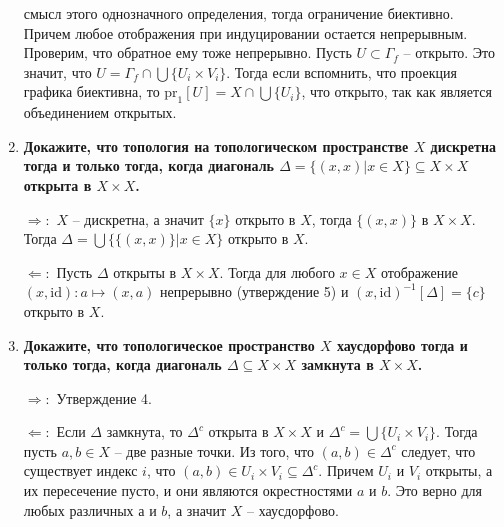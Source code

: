 \documentclass{article}
\begin{document}
\begin{enumerate}
        смысл этого однозначного определения, тогда ограничение биективно.
        Причем любое отображения при индуцировании остается непрерывным.
        Проверим, что обратное ему тоже непрерывно. Пусть $U\subset\Gamma_f$ –
        открыто. Это значит, что $U=\Gamma_f\cap\bigcup\{U_i\times V_i\}$.
        Тогда если вспомнить, что проекция графика биективна, то $\text{pr}_1
        [U] = X\cap\bigcup\{U_i\}$, что открыто, так как является объединением
        открытых. 
    \item \textbf{Докажите, что топология на топологическом пространстве $X$
        дискретна тогда и только тогда, когда диагональ $\Delta=\{(x,x)|x\in X\}
        \subseteq X\times X$ открыта в $X\times X$.}\par
        $\Rightarrow:$ $X$ – дискретна, а значит $\{x\}$ открыто в $X$, тогда 
        $\{(x, x)\}$ в $X\times X$. Тогда $\Delta=\bigcup\{\{(x,x)\}|x\in X\}$
        открыто в $X$.\par
        $\Leftarrow:$ Пусть $\Delta$ открыты в $X\times X$. Тогда для любого
        $x\in X$ отображение $(x,\text{id}): a \mapsto (x, a)$ непрерывно
        (утверждение 5) и $(x,\text{id})^{-1}[\Delta]=\{c\}$ открыто в $X$.
    \item \textbf{Докажите, что топологическое пространство $X$ хаусдорфово
        тогда и только тогда, когда диагональ $\Delta\subseteq X\times X$
        замкнута в $X\times X$.}\par
        $\Rightarrow:$ Утверждение 4.\par
        $\Leftarrow:$ Если $\Delta$ замкнута, то $\Delta^c$ открыта в $X\times
        X$ и $\Delta^c=\bigcup\{U_i\times V_i\}$. Тогда пусть $a,b\in X$ –
        две разные точки. Из того, что $(a,b)\in\Delta^c$ следует, что
        существует индекс $i$, что $(a,b)\in U_i\times V_i \subseteq\Delta^c$.
        Причем $U_i$ и $V_i$ открыты, а их пересечение пусто, и они являются
        окрестностями $a$ и $b$. Это верно для любых различных $а$ и $b$, а
        значит $X$ – хаусдорфово.
\end{enumerate}
\end{document}
